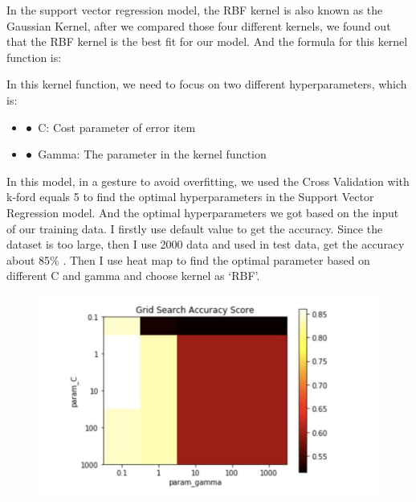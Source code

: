 \documentclass[12pt]{article}
\begin{document}
 In the support vector regression model, the RBF kernel is also known as the Gaussian Kernel, after we compared those four different kernels, we found out that the RBF kernel is the best fit for our model. And the formula for this kernel function is:\par

\begin{justify}
In this kernel function, we need to focus on two different hyperparameters, which is:
\end{justify}\par

\setlength{\parskip}{0.0pt}
\begin{itemize}
	\item ●\  C: Cost parameter of error item\par

\setlength{\parskip}{12.0pt}
	\item ●\  \textcolor[HTML]{222222}{Gamma:​ ​The parameter in the kernel function}
\end{itemize}\par

\begin{justify}
\textcolor[HTML]{222222}{In this model, in a gesture to avoid overfitting, we used the Cross Validation with k-ford equals 5 to find the optimal hyperparameters in the Support Vector Regression model. And the optimal hyperparameters we got based on the input of our training data. I firstly use default value to get the accuracy. Since the dataset is too large, then I use 2000 data and used in test data, get the accuracy about 85$\%$ . Then I use heat map to find the optimal parameter based on different C and gamma and choose kernel as ‘RBF’.}
\end{justify}\par




\begin{figure}[H]
	\begin{Center}
		\includegraphics[width=4.44in,height=2.6in]{./media/image6.jpg}
	\end{Center}
\end{figure}
\end{document}
